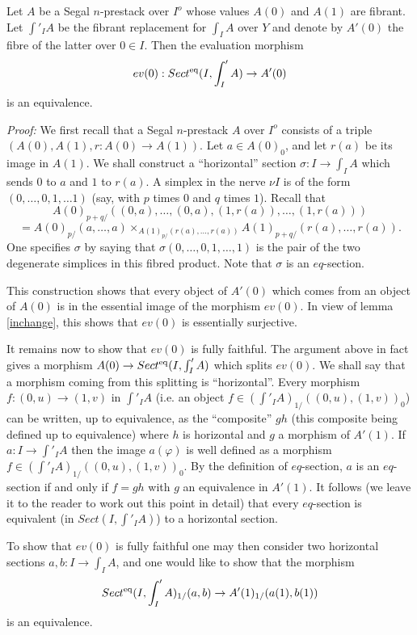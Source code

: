 \begin{lemma}
\label{casi}
Let $A$ be a Segal $n$-prestack over $I^o$ whose values
$A(0)$ and
$A(1)$ are fibrant. Let $\int '_IA$ be the fibrant replacement for $\int  _IA$
over $Y$ and denote by $A'(0)$ the fibre of the latter over $0\in
I$. Then the evaluation morphism
$$
ev(0): Sect ^{\rm eq}(I, \int '_IA)\rightarrow A'(0)
$$
is an equivalence.
\end{lemma}
{\em Proof:}
We first recall that a Segal $n$-prestack $A$ over $I^o$
consists
of a triple $(A(0), A(1), r: A(0)\rightarrow A(1))$.
Let $a\in A(0)_0$, and
let $r(a)$ be its image in $A(1)$. We shall construct a
``horizontal''
section
$\sigma :I\rightarrow\int _IA$ which sends $0$ to $a$ and $1$ to $r(a)$. A
simplex in the nerve $\nu I$ is of the form $(0,\ldots , 0, 1, \ldots
1)$ (say, with $p$ times $0$ and $q$ times $1$).
Recall that
$$
A(0)_{p+q/}((0, a),\ldots , (0,a),(1,r(a)),\ldots , (1,r(a)))
$$
$$
= A(0)_{p/}(a,\ldots , a)\times _{A(1)_{p/}(r(a),\ldots , r(a))}
A(1)_{p+q/}(r(a),\ldots , r(a)).
$$
One specifies $\sigma$ by saying that $\sigma (0,\ldots, 0, 1,\ldots , 1)$
is the pair of the two degenerate simplices in this fibred product.
Note that $\sigma$ is an $eq$-section.

This construction shows that every object of $A'(0)$ which comes from an object
of
$A(0)$ is in the essential image of the morphism $ev(0)$. In view of lemma
\ref{inchange}, this shows that $ev(0)$ is essentially surjective.




It remains now to show that $ev(0)$ is fully faithful.
The argument above in fact gives a morphism $A(0)\rightarrow
Sect ^{\rm eq}(I, \int '_IA)$ which splits $ev(0)$.
We shall say that a morphism coming from this splitting is ``horizontal''.
Every morphism $f:(0,u)\rightarrow (1,v)$ in $\int '_IA$
(i.e. an object $f\in (\int '_IA)_{1/}((0,u),(1,v))_0$) can be written, up to
equivalence, as the ``composite'' $gh$ (this
composite being defined up to
equivalence) where $h$ is horizontal and $g$ a morphism of $A'(1)$.
If $a: I\rightarrow \int '_IA$ then the image $a(\varphi )$ is well defined
as a morphism $f\in (\int '_IA)_{1/}((0,u),(1,v))_0$. By the
definition of $eq$-section, $a$ is an $eq$-section if and only if
$f=gh$ with $g$ an equivalence in $A'(1)$. It follows
(we leave it to the reader to work out this point in detail) that every
$eq$-section is equivalent (in $Sect(I, \int '_IA)$) to a horizontal
section.

To show that $ev(0)$ is fully faithful one may then consider
two horizontal sections $a,b: I\rightarrow \int _IA$, and one would like
to show that the morphism
$$
Sect ^{\rm eq}(I, \int '_IA)_{1/}(a,b)\rightarrow A'(1)_{1/}(a(1), b(1))
$$
is an equivalence.

